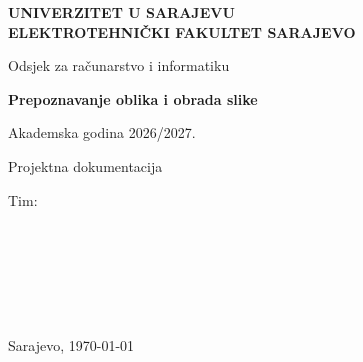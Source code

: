 \documentclass[11pt,a4paper]{article}
\begin{document}
\begin{titlepage}
\centering
{\large\bfseries UNIVERZITET U SARAJEVU\\[2pt] ELEKTROTEHNIČKI FAKULTET SARAJEVO\par}
\smallskip
Odsjek za računarstvo i informatiku\par
\vspace{1.0cm}
\textbf{Prepoznavanje oblika i obrada slike}\par
\quad Akademska godina 2026/2027.\par
\vspace{1.8cm}
{\fontsize{26}{30}\selectfont\bfseries\color{etfblue} \NazivProjekta\par}
\vspace{0.5cm}
{\Large \PodnaslovProjekta\par}
\vspace{0.6cm}
{\large Projektna dokumentacija\par}
\vspace{1.2cm}
{\Large Tim: \textbf{\NazivTima}\par}
\vspace{0.6cm}
{\large
\AutorA\\
\AutorB\\
\AutorC\\
\AutorD\\
\AutorE\\
\AutorF\par}
\vfill
Sarajevo, \today\par
\end{titlepage}

\tableofcontents
\newpage

\end{document}
